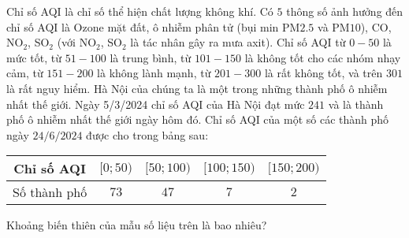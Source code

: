 \begin{ex}%
 Chỉ số AQI là chỉ số thể hiện chất lượng không khí. Có $5$ thông số ảnh hưởng đến chỉ số AQI là Ozone mặt đất, ô nhiễm phân tử (bụi min PM$2.5$ và PM$10$), CO, NO$_2$, SO$_2$ (với NO$_2$, SO$_2$ là tác nhân gây ra mưa axit). Chỉ số AQI từ $0-50$ là mức tốt, từ $51-100$ là trung bình, từ $101-150$ là không tốt cho các nhóm nhạy cảm, từ $151-200$ là không lành mạnh, từ $201-300$ là rất không tốt, và trên $301$ là rất nguy hiểm. Hà Nội của chúng ta là một trong những thành phố ô nhiễm nhất thế giới. Ngày 5/3/2024 chỉ số AQI của Hà Nội đạt mức $241$ và là thành phố ô nhiễm nhất thế giới ngày hôm đó. Chỉ số AQI của một số các thành phố ngày $24/6/2024$ được cho trong bảng sau:
 \begin{center}
 \begin{tabular}{|c|c|c|c|c|}
 \hline
 Chỉ số AQI& $[0;50)$& $[50;100)$& $[100;150)$& $[150;200)$\\\hline
 Số thành phố& $73$& $47$& $7$& $2$\\\hline
 \end{tabular}
 \end{center}
 Khoảng biến thiên của mẫu số liệu trên là bao nhiêu?
 \par
\end{ex}

